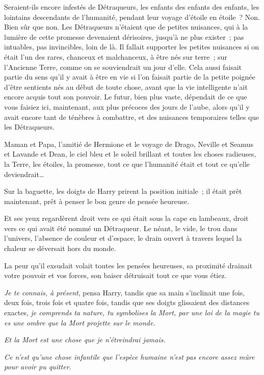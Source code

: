 Seraient-ils encore infestés de Détraqueurs, les enfants des enfants des enfants, les lointains descendants de l'humanité, pendant leur voyage d'étoile en étoile~? Non. Bien sûr que non. Les Détraqueurs n'étaient que de petites nuisances, qui à la lumière de cette promesse devenaient dérisoires, jusqu'à ne plus exister~; pas intuables, pas invincibles, loin de là. Il fallait supporter les petites nuisances si on était l'un des rares, chanceux et malchanceux, à être nés sur terre~; sur l'Ancienne Terre, comme on se souviendrait un jour d'elle. Cela aussi faisait partie du sens qu'il y avait à être en vie si l'on faisait partie de la petite poignée d'être sentients nés au début de toute chose, avant que la vie intelligente n'ait encore acquis tout son pouvoir. Le futur, bien plus vaste, dépendait de ce que vous faisiez ici, maintenant, aux plus précoces des jours de l'aube, alors qu'il y avait encore tant de ténèbres à combattre, et des nuisances temporaires telles que les Détraqueurs.

Maman et Papa, l'amitié de Hermione et le voyage de Drago, Neville et Seamus et Lavande et Dean, le ciel bleu et le soleil brillant et toutes les choses radieuses, la Terre, les étoiles, la promesse, tout ce que l'humanité était et tout ce qu'elle deviendrait…

Sur la baguette, les doigts de Harry prirent la position initiale~; il était prêt maintenant, prêt à penser le bon genre de pensée heureuse.

Et ses yeux regardèrent droit vers ce qui était sous la cape en lambeaux, droit vers ce qui avait été nommé un Détraqueur. Le néant, le vide, le trou dans l'univers, l'absence de couleur et d'espace, le drain ouvert à travers lequel la chaleur se déversait hors du monde.

La peur qu'il exsudait volait toutes les pensées heureuses, sa proximité drainait votre pouvoir et vos forces, son baiser détruisait tout ce que vous étiez.

\emph{Je te connais, à présent}, pensa Harry, tandis que sa main s'inclinait une fois, deux fois, trois fois et quatre fois, tandis que ses doigts glissaient des distances exactes, \emph{je comprends ta nature, tu symbolises la Mort, par une loi de la magie tu es une ombre que la Mort projette sur le monde.}

\emph{Et la Mort est une chose que je n'étreindrai jamais.}

\emph{Ce n'est qu'une chose infantile que l'espèce humaine n'est pas encore assez mûre pour avoir pu quitter.}

